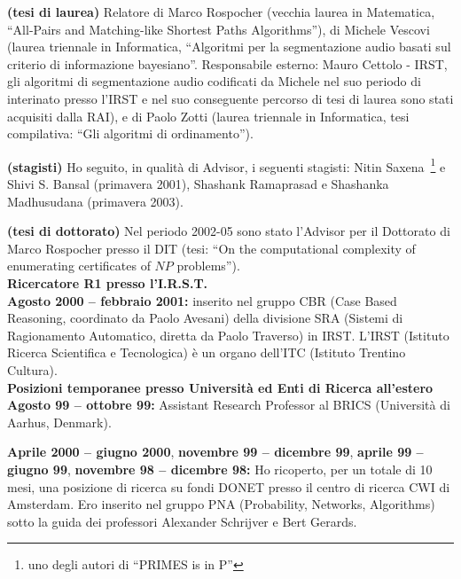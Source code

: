 \documentclass[10pt]{article}
\newcommand{\subvoice}[1] { {\large \bf #1} \smallskip\\ }
\begin{document}
{\bf (tesi di laurea)} Relatore di Marco Rospocher
(vecchia laurea in Matematica,%
 ``All-Pairs and Matching-like Shortest Paths Algorithms''),
di Michele Vescovi
(laurea triennale in Informatica,%
 ``Algoritmi per la segmentazione audio basati
   sul criterio di informazione bayesiano''.
 Responsabile esterno: Mauro Cettolo - IRST,
gli algoritmi di segmentazione audio codificati da Michele
nel suo periodo di interinato presso l'IRST
e nel suo conseguente percorso di tesi di laurea sono stati
acquisiti dalla RAI),
e di Paolo Zotti
(laurea triennale in Informatica,
 tesi compilativa: ``Gli algoritmi di ordinamento'').

{\bf (stagisti)} Ho seguito, in qualit\`a di Advisor,
i seguenti stagisti: Nitin Saxena~\footnote{uno degli autori di ``PRIMES is in P''} e Shivi S. Bansal (primavera 2001),
Shashank Ramaprasad e Shashanka Madhusudana (primavera 2003).

{\bf (tesi di dottorato)} Nel periodo 2002-05 sono stato l'Advisor per il Dottorato di Marco
Rospocher presso il DIT (tesi: ``On the computational complexity
of enumerating certificates of $NP$ problems'').\\


\subvoice{Ricercatore R1 presso l'I.R.S.T.}
{\bf Agosto 2000 -- febbraio 2001:}
inserito nel gruppo CBR (Case Based Reasoning, coordinato da Paolo Avesani)
della divisione SRA
(Sistemi di Ragionamento Automatico, diretta da Paolo Traverso) in IRST.
L'IRST (Istituto Ricerca Scientifica e Tecnologica)
\`e un organo dell'ITC (Istituto Trentino Cultura).\\

\subvoice{Posizioni temporanee presso Universit\`a ed Enti di Ricerca all'estero}
{\bf Agosto 99 -- ottobre 99:}
     Assistant Research Professor
     al  BRICS (Universit\`a di Aarhus, Denmark). 

\noindent
{\bf Aprile 2000 -- giugno 2000},
{\bf novembre 99 -- dicembre 99},
{\bf aprile 99 -- giugno 99},
{\bf novembre 98 -- dicembre 98:}
      Ho ricoperto, per un totale di 10 mesi,
      una posizione di ricerca su fondi DONET
      presso il centro di ricerca CWI di Amsterdam.
      Ero inserito nel gruppo PNA (Probability, Networks, Algorithms)
      sotto la guida dei professori Alexander Schrijver
      e Bert Gerards.\\
\end{document}
